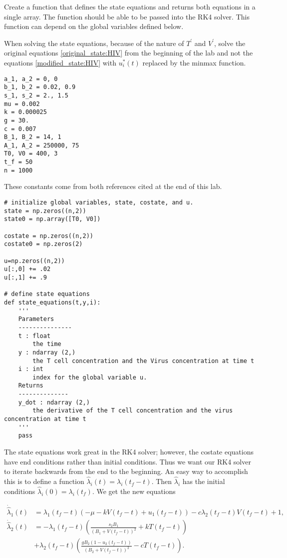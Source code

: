 \begin{problem}
Create a function that defines the state equations and returns both equations in a single array. The function should be able to be passed into the RK4 solver. This function can depend on the global variables defined below.

\begin{warn}
When solving the state equations, because of the nature of $T^\prime$ and $V^\prime$, solve the original equations \eqref{original_state:HIV} from the beginning of the lab and not the equations \eqref{modified_state:HIV} with $u_i^*(t)$ replaced by the minmax function.
\end{warn}

\begin{lstlisting}
a_1, a_2 = 0, 0
b_1, b_2 = 0.02, 0.9
s_1, s_2 = 2., 1.5
mu = 0.002
k = 0.000025
g = 30.
c = 0.007
B_1, B_2 = 14, 1
A_1, A_2 = 250000, 75
T0, V0 = 400, 3
t_f = 50
n = 1000
\end{lstlisting}
These constants come from both references cited at the end of this lab. 

\begin{lstlisting}
# initialize global variables, state, costate, and u.
state = np.zeros((n,2))
state0 = np.array([T0, V0])
	
costate = np.zeros((n,2))
costate0 = np.zeros(2)

u=np.zeros((n,2))
u[:,0] += .02
u[:,1] += .9

# define state equations
def state_equations(t,y,i):
	'''
	Parameters
	---------------
	t : float
		the time
	y : ndarray (2,)
		the T cell concentration and the Virus concentration at time t
	i : int
		index for the global variable u.
	Returns
	--------------
	y_dot : ndarray (2,)
		the derivative of the T cell concentration and the virus concentration at time t
	'''
	pass
\end{lstlisting}
\label{problem:hiv:state}
\end{problem}


The state equations work great in the RK4 solver; however, the costate equations have end conditions rather than initial conditions. Thus we want our RK4 solver to iterate backwards from the end to the beginning. An easy way to accomplish this is to define a function $ \hat{\lambda}_i(t)=\lambda_i(t_f - t).$ Then $\hat{\lambda}_i$ has the initial conditions $\hat{\lambda}_i(0) = \lambda_i(t_f)$. We get the new equations

\begin{align*}
\dot{\hat{\lambda}}_1(t) &=\lambda_1(t_f-t)\left(-\mu - kV(t_f-t) + u_{1}(t_f-t)\right) - c\lambda_2(t_f-t)V(t_f-t) + 1, \\
\dot{\hat{\lambda}}_2(t) &= -\lambda_1(t_f-t)\left(\frac{s_2B_1}{(B_1+V(t_f-t))^2}+kT(t_f-t)\right) \\
&+ \lambda_2(t_f-t)\left(\frac{gB_2(1-u_2(t_f-t))}{(B_2 + V(t_f-t))^2} - cT(t_f-t)\right).
\end{align*}

